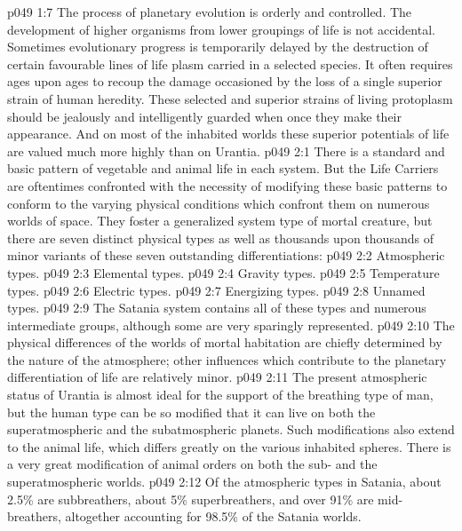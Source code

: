 \vs p049 1:7 The process of planetary evolution is orderly and controlled. The development of higher organisms from lower groupings of life is not accidental. Sometimes evolutionary progress is temporarily delayed by the destruction of certain favourable lines of life plasm carried in a selected species. It often requires ages upon ages to recoup the damage occasioned by the loss of a single superior strain of human heredity. These selected and superior strains of living protoplasm should be jealously and intelligently guarded when once they make their appearance. And on most of the inhabited worlds these superior potentials of life are valued much more highly than on Urantia.
\vs p049 2:1 There is a standard and basic pattern of vegetable and animal life in each system. But the Life Carriers are oftentimes confronted with the necessity of modifying these basic patterns to conform to the varying physical conditions which confront them on numerous worlds of space. They foster a generalized system type of mortal creature, but there are seven distinct physical types as well as thousands upon thousands of minor variants of these seven outstanding differentiations:
\vs p049 2:2 \bibnobreakspace Atmospheric types.
\vs p049 2:3 \bibnobreakspace Elemental types.
\vs p049 2:4 \bibnobreakspace Gravity types.
\vs p049 2:5 \bibnobreakspace Temperature types.
\vs p049 2:6 \bibnobreakspace Electric types.
\vs p049 2:7 \bibnobreakspace Energizing types.
\vs p049 2:8 \bibnobreakspace Unnamed types.
\vs p049 2:9 \pc The Satania system contains all of these types and numerous intermediate groups, although some are very sparingly represented.
\vs p049 2:10 \bibnobreakspace {} The physical differences of the worlds of mortal habitation are chiefly determined by the nature of the atmosphere; other influences which contribute to the planetary differentiation of life are relatively minor.
\vs p049 2:11 The present atmospheric status of Urantia is almost ideal for the support of the breathing type of man, but the human type can be so modified that it can live on both the superatmospheric and the subatmospheric planets. Such modifications also extend to the animal life, which differs greatly on the various inhabited spheres. There is a very great modification of animal orders on both the sub\hyp{} and the superatmospheric worlds.
\vs p049 2:12 Of the atmospheric types in Satania, about 2.5\% are subbreathers, about 5\% superbreathers, and over 91\% are mid\hyp{}breathers, altogether accounting for 98.5\% of the Satania worlds.
